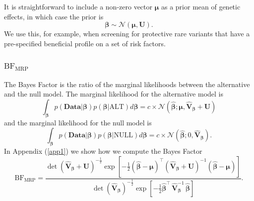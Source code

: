 \documentclass{nature}
\def\bs{\boldsymbol}
\begin{document}
\noindent It is straightforward to include a non-zero vector ${\bs\mu}$ as a prior mean of genetic effects, in which case the prior is
$${\bs {\beta}} \sim \mathcal{N}\left({\bs \mu},\mathbf{U}\right).$$
We use this, for example, when screening for protective rare variants that have a pre-specified beneficial profile on a set of risk factors.


\subsubsection{$\textrm{BF}_{\textrm{MRP}}$} 
\label{bfmodel}
\noindent The Bayes Factor is the ratio of the marginal likelihoods between the alternative and the null model. 
\noindent The marginal likelihood for the alternative model is 
$$ \int_{{\bs {\beta}}} p\left(\mathbf{\textrm{Data}}|{\bs {\beta}}\right) p\left({\bs {\beta}}|\textrm{ALT}\right)d{\bs {\beta}} = c \times \mathcal{N}\left({ {\widehat{\bs \beta}}}; {\bs \mu},  \widehat{\mathbf{\textrm{V}}}_{{\bs {\beta}}} + \mathbf{U}\right)$$
\noindent and the marginal likelihood for the null model is 
$$\int_{{\bs {\beta}}} p\left(\mathbf{\textrm{Data}}|{\bs {\beta}}\right) p\left({\bs {\beta}}|\textrm{NULL}\right)d{\bs {\beta}} = c \times \mathcal{N}\left({ {\widehat{\bs \beta}}}; 0,  \widehat{\mathbf{\textrm{V}}}_{{\bs {\beta}}}\right).$$
\noindent In Appendix (\ref{app1}) we show how we compute the Bayes Factor
$$\textrm{BF}_{\textrm{MRP}} = \frac{\det\left(\widehat{\mathbf{\textrm{V}}}_{{\bs {\beta}}} + \mathbf{U} \right)^{-\frac{1}{2}}
\exp\left[-\frac{1}{2}\left({\bs {\widehat{\beta}} - {\bs \mu}}\right)^{\intercal}\left(\widehat{\mathbf{\textrm{V}}}_{{\bs {\beta}}} + \mathbf{U}\right)^{-1}\left({\bs {\widehat{\beta}}} - {\bs \mu}\right)\right]}
{\det \left( \widehat{\mathbf{\textrm{V}}}_{\bs {\beta}}\right)^{-\frac{1}{2}}\exp \left[-\frac{1}{2}{\bs {\widehat{\beta}}}^{\intercal}\, \widehat{\mathbf{\textrm{V}}}_{\bs {\beta}}^{-1} 
\,{\bs {\widehat{\beta}}}\right]}.$$
\end{document}
